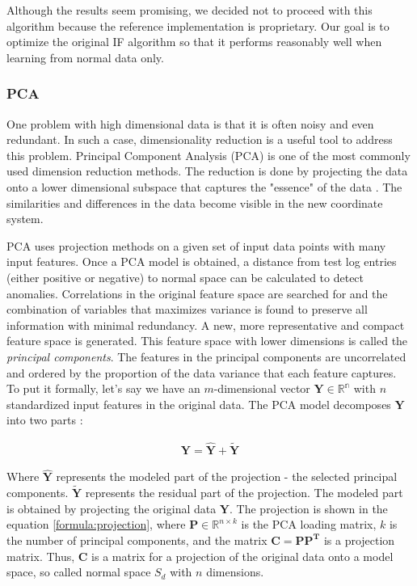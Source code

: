 Although the results seem promising, we decided not to proceed with this algorithm because the reference implementation is proprietary.
Our goal is to optimize the original IF algorithm so that it performs reasonably well when learning from normal data only.
 
\subsubsection{PCA}
\label{section:lrPCA}
One problem with high dimensional data is that it is often noisy and even redundant. In such a case, dimensionality reduction is a useful tool to address this problem. Principal Component Analysis (PCA) is one of the most commonly used dimension reduction methods. The reduction is done by projecting the data onto a lower dimensional subspace that captures the "essence" of the data \cite{murphy2013machine}. The similarities and differences in the data become visible in the new coordinate system. 

PCA uses projection methods on a given set of input data points with many input features. Once a PCA model is obtained, a distance from test log entries (either positive or negative) to normal space can be calculated to detect anomalies. Correlations in the original feature space are searched for and the combination of variables that maximizes variance is found to preserve all information with minimal redundancy. A new, more representative and compact feature space is generated. This feature space with lower dimensions is called the \textit{principal components}. The features in the principal components are uncorrelated and ordered by the proportion of the data variance that each feature captures.\\

To put it formally, let's say we have an $m$-dimensional vector $\mathbf{Y} \in \mathbb{R^n}$ with $n$ standardized input features in the original data. The PCA model decomposes $\mathbf{Y}$ into two parts \cite{pca1997}:

\begin{gather}
 \mathbf{Y} = \mathbf{\hat{Y}} + \mathbf{\widetilde{Y}}
\end{gather}

Where $\mathbf{\hat{Y}}$ represents the modeled part of the projection - the selected principal components. $\mathbf{\widetilde{Y}}$ represents the residual part of the projection. The modeled part is obtained by projecting the original data $\mathbf{{Y}}$. The projection is shown in the equation \ref{formula:projection}, where $\mathbf{P} \in \mathbb{R}^{n \times k}$ is the PCA loading matrix, $k$ is the number of principal components, and the matrix $\mathbf{C = \mathbf{ PP }^T}$ is a projection matrix. 
Thus, $\mathbf{C}$ is a matrix for a projection of the original data onto a model space, so called normal space $S_d$ with $n$ dimensions.

